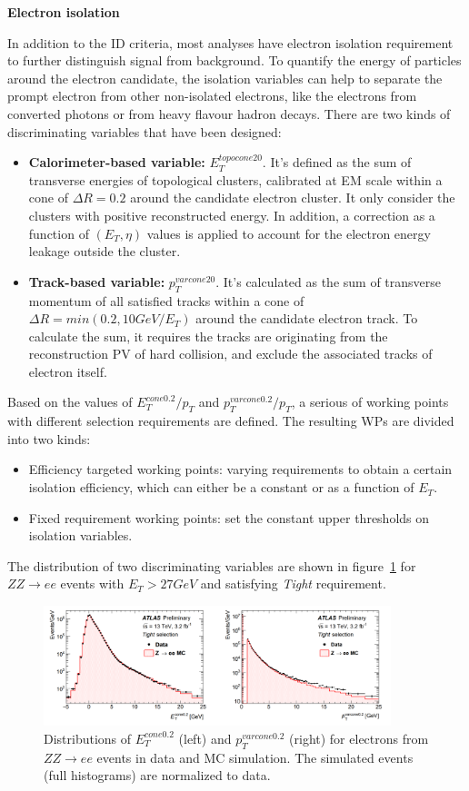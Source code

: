 \textbf{Electron isolation}

In addition to the ID criteria, most analyses have electron isolation requirement to further distinguish signal from background.
To quantify the energy of particles around the electron candidate, the isolation variables can help to separate the prompt electron from other non-isolated electrons, like the electrons from converted photons or from heavy flavour hadron decays.
There are two kinds of discriminating variables that have been designed:
\begin{itemize}
	\item \textbf{Calorimeter-based variable:} $E_{T}^{topocone20}$. It's defined as the sum of transverse energies of topological clusters\cite{Aad:2016upy}, calibrated at EM scale within a cone of $\Delta R = 0.2$ around the  candidate electron cluster. It only consider the clusters with positive reconstructed energy. In addition, a correction as a function of $(E_{T}, \eta)$ values is applied to account for the electron energy leakage outside the cluster.
	\item \textbf{Track-based variable:} $p_{T}^{varcone20}$. It's calculated as the sum of transverse momentum of all satisfied tracks within a cone of $\Delta R = min(0.2, 10 GeV/E_{T})$ around the candidate electron track. To calculate the sum, it requires the tracks are originating from the reconstruction PV of hard collision, and exclude the associated tracks of electron itself.
\end{itemize}
Based on the values of $E_{T}^{cone0.2}/p_{T}$ and $p_{T}^{varcone0.2}/p_{T}$, a serious of working points with different selection requirements are defined.
The resulting WPs are divided into two kinds:
\begin{itemize}
	\item Efficiency targeted working points: varying requirements to obtain a certain isolation efficiency, which can either be a constant or as a function of $E_{T}$.
	\item Fixed requirement working points: set the constant upper thresholds on isolation variables.
\end{itemize}
The distribution of two discriminating variables are shown in figure~\ref{fig:ele_iso} for $ZZ \rightarrow ee$ events with $E_{T} > 27 GeV$ and satisfying \textit{Tight} requirement.
\begin{figure}[!htb]
  \centering
  \includegraphics[width=0.9\textwidth]{figures/Simulation/ele_iso.png}
  \caption{Distributions of $E_{T}^{cone0.2}$ (left) and $p_{T}^{varcone0.2}$ (right) for electrons from $ZZ \rightarrow ee$ events in data and MC simulation. The simulated events (full histograms) are normalized to data.}
  \label{fig:ele_iso}
\end{figure}

